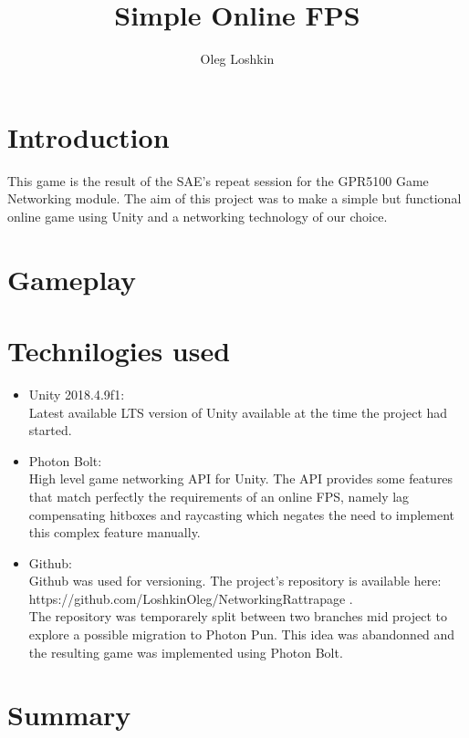 \documentclass[10pt,a4paper]{article}
\author{Oleg Loshkin}
\title{Simple Online FPS}
\begin{document}
\maketitle

\section{Introduction}
This game is the result of the SAE's repeat session for the GPR5100 Game Networking module. The aim of this project was to make a simple but functional online game using Unity and a networking technology of our choice.

\section{Gameplay}


\section{Technilogies used}
\begin{itemize}
\item Unity 2018.4.9f1:\\
Latest available LTS version of Unity available at the time the project had started.
\item Photon Bolt:\\
High level game networking API for Unity. The API provides some features that match perfectly the requirements of an online FPS, namely lag compensating hitboxes and raycasting which negates the need to implement this complex feature manually.
\item Github:\\
Github was used for versioning. The project's repository is available here: https://github.com/LoshkinOleg/NetworkingRattrapage .\\
The repository was temporarely split between two branches mid project to explore a possible migration to Photon Pun. This idea was abandonned and the resulting game was implemented using Photon Bolt.
\end{itemize}

\section{Summary}
\end{document}
